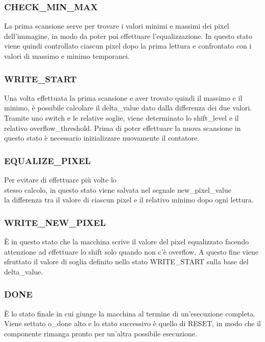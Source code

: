 \documentclass{article}
\begin{document}
\subsubsection{CHECK\_MIN\_MAX}
La prima scansione serve per trovare i valori minimi e massimi dei pixel dell'immagine, in modo da poter poi effettuare l'equalizzazione. In questo stato viene quindi controllato ciascun pixel dopo la prima lettura e confrontato con i valori di massimo e minimo temporanei.

\subsubsection{WRITE\_START}
Una volta effettuata la prima scansione e aver trovato quindi il massimo e il minimo, è possibile calcolare il delta\_value dato dalla differenza dei due valori. Tramite uno switch e le relative soglie, viene determinato lo shift\_level e il relativo overflow\_threshold. Prima di poter effettuare la nuova scansione in questo stato è necessario inizializzare nuovamente il contatore.

\subsubsection{EQUALIZE\_PIXEL}
Per evitare di effettuare più volte lo\\ stesso calcolo, in questo stato viene salvata nel segnale new\_pixel\_value\\ la differenza tra il valore di ciascun pixel e il relativo minimo dopo ogni lettura.

\subsubsection{WRITE\_NEW\_PIXEL}
È in questo stato che la macchina scrive il valore del pixel equalizzato facendo attenzione ad effettuare lo shift solo quando non c'è overflow. A questo fine viene sfruttato il valore di soglia definito nello stato WRITE\_START sulla base del delta\_value.

\subsubsection{DONE}
È lo stato finale in cui giunge la macchina al termine di un'esecuzione completa. Viene settato o\_done alto e lo stato successivo è quello di RESET, in modo che il componente rimanga pronto per un'altra possibile esecuzione.
\end{document}
